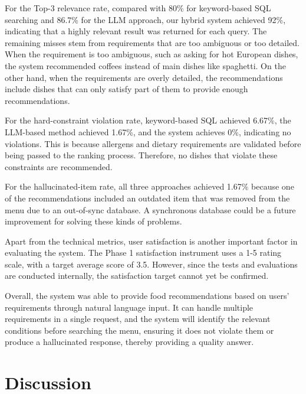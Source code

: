 \documentclass{article}
\begin{document}
For the Top-3 relevance rate, compared with 80\% for keyword-based SQL searching and 86.7\% for the LLM approach, our hybrid system achieved 92\%, indicating that a highly relevant result was returned for each query. The remaining misses stem from requirements that are too ambiguous or too detailed. When the requirement is too ambiguous, such as asking for hot European dishes, the system recommended coffees instead of main dishes like spaghetti. On the other hand, when the requirements are overly detailed, the recommendations include dishes that can only satisfy part of them to provide enough recommendations. 

For the hard-constraint violation rate, keyword-based SQL achieved 6.67\%, the LLM-based method achieved 1.67\%, and the system achieves 0\%, indicating no violations. This is because allergens and dietary requirements are validated before being passed to the ranking process. Therefore, no dishes that violate these constraints are recommended. 

For the hallucinated-item rate, all three approaches achieved 1.67\% because one of the recommendations included an outdated item that was removed from the menu due to an out-of-sync database. A synchronous database could be a future improvement for solving these kinds of problems.

Apart from the technical metrics, user satisfaction is another important factor in evaluating the system. The Phase 1 satisfaction instrument uses a 1-5 rating scale, with a target average score of 3.5. However, since the tests and evaluations are conducted internally, the satisfaction target cannot yet be confirmed.

Overall, the system was able to provide food recommendations based on users' requirements through natural language input. It can handle multiple requirements in a single request, and the system will identify the relevant conditions before searching the menu, ensuring it does not violate them or produce a hallucinated response, thereby providing a quality answer.

\section{Discussion}
\end{document}
